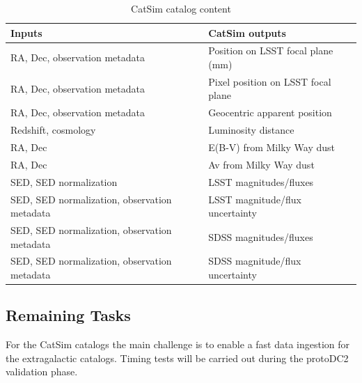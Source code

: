 \documentclass[preprint,times]{aastex61}
\begin{document}
\begin{table}[!htb]
  \centering
   \caption{CatSim catalog content}
  \label{tab:catsim}
  \begin{tabular}{| l| l| }
    \hline 
Inputs        &               CatSim outputs \\
\hline
RA, Dec, observation metadata    &   Position on LSST focal plane (mm)\\
RA, Dec, observation metadata  &  Pixel position on LSST focal plane \\
RA, Dec, observation metadata         &  Geocentric apparent position  \\
Redshift, cosmology                  &    Luminosity distance\\
RA, Dec         &   E(B-V) from Milky Way dust   \\
RA, Dec                &   Av from Milky Way dust\\
SED, SED normalization                &   LSST magnitudes/fluxes\\
SED, SED normalization, observation metadata       & LSST magnitude/flux uncertainty  \\
SED, SED normalization, observation metadata              &   SDSS magnitudes/fluxes  \\
SED, SED normalization, observation metadata      &   SDSS magnitude/flux uncertainty \\
   \hline
  \end{tabular}
\end{table}

\subsection{Remaining Tasks}
For the CatSim catalogs the main challenge is to enable a fast data ingestion for the extragalactic catalogs. Timing tests will be carried out during the protoDC2 validation phase.
\end{document}
